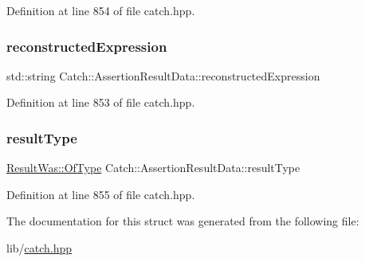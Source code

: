 Definition at line 854 of file catch.\+hpp.

\hypertarget{struct_catch_1_1_assertion_result_data_a9e809d36fffbeb1c7d0cbe7382dd9595}{}\label{struct_catch_1_1_assertion_result_data_a9e809d36fffbeb1c7d0cbe7382dd9595} 
\subsubsection{\texorpdfstring{reconstructed\+Expression}{reconstructedExpression}}
{\footnotesize\ttfamily std\+::string Catch\+::\+Assertion\+Result\+Data\+::reconstructed\+Expression}



Definition at line 853 of file catch.\+hpp.

\hypertarget{struct_catch_1_1_assertion_result_data_a7ceab4a7ff722aec5587e3748caf66b7}{}\label{struct_catch_1_1_assertion_result_data_a7ceab4a7ff722aec5587e3748caf66b7} 
\subsubsection{\texorpdfstring{result\+Type}{resultType}}
{\footnotesize\ttfamily \hyperlink{struct_catch_1_1_result_was_a624e1ee3661fcf6094ceef1f654601ef}{Result\+Was\+::\+Of\+Type} Catch\+::\+Assertion\+Result\+Data\+::result\+Type}



Definition at line 855 of file catch.\+hpp.



The documentation for this struct was generated from the following file\+:\begin{DoxyCompactItemize}
\item 
lib/\hyperlink{catch_8hpp}{catch.\+hpp}\end{DoxyCompactItemize}
